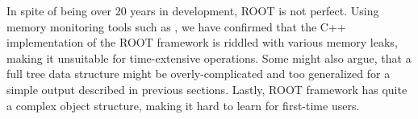 In spite of being over 20 years in development, ROOT is not perfect. Using memory monitoring tools such as \cite{nethercote2007valgrind}, we have confirmed that the C++ implementation of the ROOT framework is riddled with various memory leaks, making it unsuitable for time-extensive operations. Some might also argue, that a full tree data structure might be overly-complicated and too generalized for a simple output described in previous sections. Lastly, ROOT framework has quite a complex object structure, making it hard to learn for first-time users.

